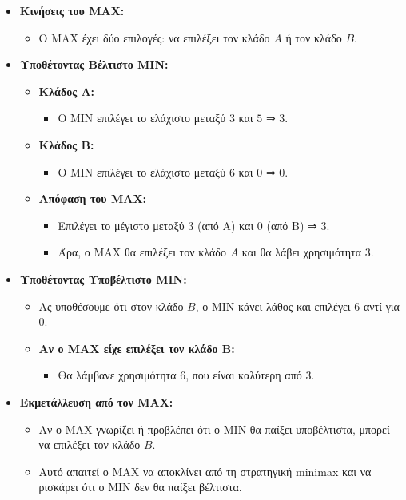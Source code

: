 \documentclass{article}
\begin{document}
\begin{itemize}
    \item \textbf{Κινήσεις του MAX:}
    \begin{itemize}
        \item Ο MAX έχει δύο επιλογές: να επιλέξει τον κλάδο \(A\) ή τον κλάδο \(B\).
    \end{itemize}

    \item \textbf{Υποθέτοντας Βέλτιστο MIN:}
    \begin{itemize}
        \item \textbf{Κλάδος A:}
        \begin{itemize}
            \item Ο MIN επιλέγει το ελάχιστο μεταξύ \(3\) και \(5\) ⇒ \(3\).
        \end{itemize}
        \item \textbf{Κλάδος B:}
        \begin{itemize}
            \item Ο MIN επιλέγει το ελάχιστο μεταξύ \(6\) και \(0\) ⇒ \(0\).
        \end{itemize}
        \item \textbf{Απόφαση του MAX:}
        \begin{itemize}
            \item Επιλέγει το μέγιστο μεταξύ \(3\) (από A) και \(0\) (από B) ⇒ \(3\).
            \item Άρα, ο MAX θα επιλέξει τον κλάδο \(A\) και θα λάβει χρησιμότητα \(3\).
        \end{itemize}
    \end{itemize}

    \item \textbf{Υποθέτοντας Υποβέλτιστο MIN:}
    \begin{itemize}
        \item Ας υποθέσουμε ότι στον κλάδο \(B\), ο MIN κάνει λάθος και επιλέγει \(6\) αντί για \(0\).
        \item \textbf{Αν ο MAX είχε επιλέξει τον κλάδο B:}
        \begin{itemize}
            \item Θα λάμβανε χρησιμότητα \(6\), που είναι καλύτερη από \(3\).
        \end{itemize}
    \end{itemize}

    \item \textbf{Εκμετάλλευση από τον MAX:}
    \begin{itemize}
        \item Αν ο MAX γνωρίζει ή προβλέπει ότι ο MIN θα παίξει υποβέλτιστα, μπορεί να επιλέξει τον κλάδο \(B\).
        \item Αυτό απαιτεί ο MAX να αποκλίνει από τη στρατηγική minimax και να ρισκάρει ότι ο MIN δεν θα παίξει βέλτιστα.
    \end{itemize}
\end{itemize}
\end{document}
